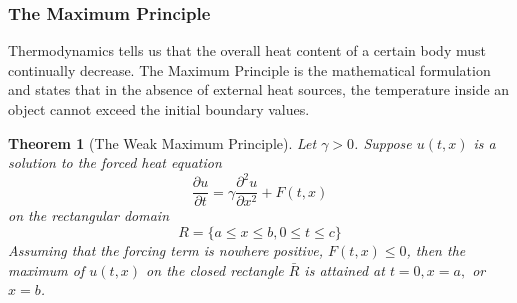 \documentclass{article}
\newcommand{\pd}[2]{\frac{\partial #1}{\partial #2}}
\newcommand{\pdt}[2]{\frac{\partial ^2 #1}{\partial #2 ^2}}
\newtheorem{theorem}{Theorem}[section]
\numberwithin{equation}{section}
\begin{document}
\subsubsection{The Maximum Principle}
Thermodynamics tells us that the overall heat content of a certain body must continually decrease. The Maximum Principle is the mathematical formulation and states that in the absence of external heat sources, the temperature inside an object cannot exceed the initial boundary values.
\begin{theorem}[The Weak Maximum Principle]
    Let $\gamma >0$. Suppose $u(t,x)$ is a solution to the forced heat equation 
    \begin{equation*}
        \pd{u}{t} = \gamma \pdt{u}{x} + F(t,x)
    \end{equation*}
    on the rectangular domain 
    \begin{equation*}
        R=\{a\leq x \leq b, 0 \leq t \leq c \}
    \end{equation*}
    Assuming that the forcing term is nowhere positive, $F(t,x) \leq 0$, then the maximum of $u(t,x)$ on the closed rectangle $\bar{R}$ is attained at $t=0, x=a,$ or $x=b$.
\end{theorem}
\end{document}
